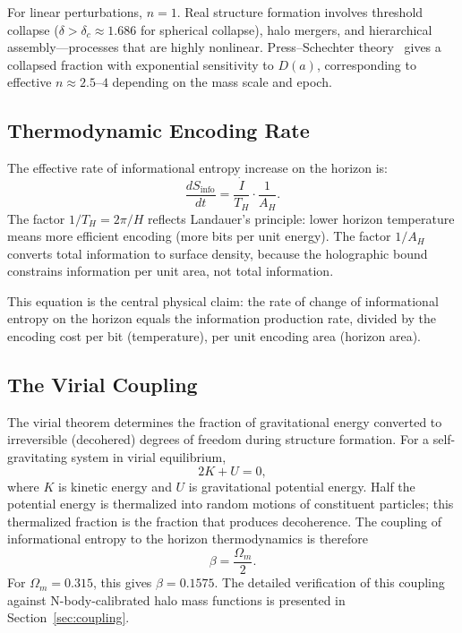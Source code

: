 \documentclass[11pt]{article}
\begin{document}
For linear perturbations, $n = 1$.  Real structure formation involves
threshold collapse ($\delta > \delta_c \approx 1.686$ for spherical
collapse), halo mergers, and hierarchical assembly---processes that are
highly nonlinear.  Press--Schechter theory~\citep{Press1974} gives a
collapsed fraction with exponential sensitivity to $D(a)$, corresponding
to effective $n \approx 2.5$--$4$ depending on the mass scale and epoch.

\subsection{Thermodynamic Encoding Rate}

The effective rate of informational entropy increase on the horizon is:
\begin{equation}
\frac{dS_\mathrm{info}}{dt} = \frac{\dot{I}}{T_H}\cdot\frac{1}{A_H}.
\label{eq:dSinfo}
\end{equation}
The factor $1/T_H = 2\pi/H$ reflects Landauer's principle: lower horizon
temperature means more efficient encoding (more bits per unit energy).  The
factor $1/A_H$ converts total information to surface density, because the
holographic bound constrains information per unit area, not total information.

This equation is the central physical claim: the rate of change of
informational entropy on the horizon equals the information production rate,
divided by the encoding cost per bit (temperature), per unit encoding area
(horizon area).

\subsection{The Virial Coupling}
\label{sec:virial_intro}

The virial theorem determines the fraction of gravitational energy converted
to irreversible (decohered) degrees of freedom during structure formation.
For a self-gravitating system in virial equilibrium,
\begin{equation}
2K + U = 0,
\label{eq:virial}
\end{equation}
where $K$ is kinetic energy and $U$ is gravitational potential energy.  Half
the potential energy is thermalized into random motions of constituent
particles; this thermalized fraction is the fraction that produces
decoherence.  The coupling of informational entropy to the horizon
thermodynamics is therefore
\begin{equation}
\beta = \frac{\Omega_m}{2}.
\label{eq:beta}
\end{equation}
For $\Omega_m = 0.315$, this gives $\beta = 0.1575$.  The detailed
verification of this coupling against N-body-calibrated halo mass functions
is presented in Section~\ref{sec:coupling}.
\end{document}
